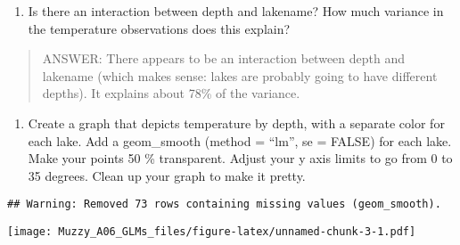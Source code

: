 \documentclass[]{article}
\newenvironment{Shaded}{\begin{snugshade}}{\end{snugshade}}
\newcommand{\KeywordTok}[1]{\textcolor[rgb]{0.13,0.29,0.53}{\textbf{#1}}}
\newcommand{\DataTypeTok}[1]{\textcolor[rgb]{0.13,0.29,0.53}{#1}}
\newcommand{\DecValTok}[1]{\textcolor[rgb]{0.00,0.00,0.81}{#1}}
\newcommand{\FloatTok}[1]{\textcolor[rgb]{0.00,0.00,0.81}{#1}}
\newcommand{\StringTok}[1]{\textcolor[rgb]{0.31,0.60,0.02}{#1}}
\newcommand{\CommentTok}[1]{\textcolor[rgb]{0.56,0.35,0.01}{\textit{#1}}}
\newcommand{\OtherTok}[1]{\textcolor[rgb]{0.56,0.35,0.01}{#1}}
\newcommand{\OperatorTok}[1]{\textcolor[rgb]{0.81,0.36,0.00}{\textbf{#1}}}
\newcommand{\NormalTok}[1]{#1}
\providecommand{\tightlist}{%
  \setlength{\itemsep}{0pt}\setlength{\parskip}{0pt}}
\begin{document}
\begin{enumerate}
\def\labelenumi{\arabic{enumi}.}
\setcounter{enumi}{14}
\tightlist
\item
  Is there an interaction between depth and lakename? How much variance
  in the temperature observations does this explain?
\end{enumerate}

\begin{quote}
ANSWER: There appears to be an interaction between depth and lakename
(which makes sense: lakes are probably going to have different depths).
It explains about 78\% of the variance.
\end{quote}

\begin{enumerate}
\def\labelenumi{\arabic{enumi}.}
\setcounter{enumi}{15}
\tightlist
\item
  Create a graph that depicts temperature by depth, with a separate
  color for each lake. Add a geom\_smooth (method = ``lm'', se = FALSE)
  for each lake. Make your points 50 \% transparent. Adjust your y axis
  limits to go from 0 to 35 degrees. Clean up your graph to make it
  pretty.
\end{enumerate}

\begin{Shaded}
\end{Shaded}

\begin{verbatim}
## Warning: Removed 73 rows containing missing values (geom_smooth).
\end{verbatim}

\texttt{[image: Muzzy\_A06\_GLMs\_files/figure-latex/unnamed-chunk-3-1.pdf]}
\end{document}
